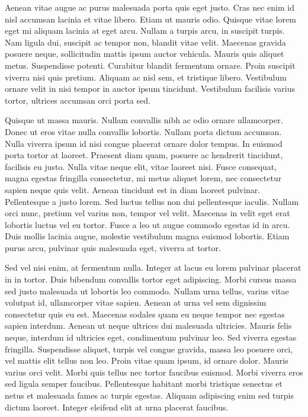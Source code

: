 Aenean vitae augue ac purus malesuada porta quis eget justo.
Cras nec enim id nisl accumsan lacinia et vitae libero.
Etiam ut mauris odio.
Quisque vitae lorem eget mi aliquam lacinia at eget arcu.
Nullam a turpis arcu, in suscipit turpis.
Nam ligula dui, suscipit ac tempor non, blandit vitae velit.
Maecenas gravida posuere neque, sollicitudin mattis ipsum auctor vehicula.
Mauris quis aliquet metus.
Suspendisse potenti.
Curabitur blandit fermentum ornare.
Proin suscipit viverra nisi quis pretium.
Aliquam ac nisl sem, et tristique libero.
Vestibulum ornare velit in nisi tempor in auctor ipsum tincidunt.
Vestibulum facilisis varius tortor, ultrices accumsan orci porta sed.

Quisque ut massa mauris.
Nullam convallis nibh ac odio ornare ullamcorper.
Donec ut eros vitae nulla convallis lobortis.
Nullam porta dictum accumsan.
Nulla viverra ipsum id nisi congue placerat ornare dolor tempus.
In euismod porta tortor at laoreet.
Praesent diam quam, posuere ac hendrerit tincidunt, facilisis eu justo.
Nulla vitae neque elit, vitae laoreet nisi.
Fusce consequat, magna egestas fringilla consectetur, mi metus aliquet lorem, nec consectetur sapien neque quis velit.
Aenean tincidunt est in diam laoreet pulvinar.
Pellentesque a justo lorem.
Sed luctus tellus non dui pellentesque iaculis.
Nullam orci nunc, pretium vel varius non, tempor vel velit.
Maecenas in velit eget erat lobortis luctus vel eu tortor.
Fusce a leo ut augue commodo egestas id in arcu.
Duis mollis lacinia augue, molestie vestibulum magna euismod lobortis.
Etiam purus arcu, pulvinar quis malesuada eget, viverra at tortor.

Sed vel nisi enim, at fermentum nulla.
Integer at lacus eu lorem pulvinar placerat in in tortor.
Duis bibendum convallis tortor eget adipiscing.
Morbi cursus massa sed justo malesuada ut lobortis leo commodo.
Nullam urna tellus, varius vitae volutpat id, ullamcorper vitae sapien.
Aenean at urna vel sem dignissim consectetur quis eu est.
Maecenas sodales quam eu neque tempor nec egestas sapien interdum.
Aenean ut neque ultrices dui malesuada ultricies.
Mauris felis neque, interdum id ultricies eget, condimentum pulvinar leo.
Sed viverra egestas fringilla.
Suspendisse aliquet, turpis vel congue gravida, massa leo posuere orci, vel mattis elit tellus non leo.
Proin vitae quam ipsum, id ornare dolor.
Mauris varius orci velit.
Morbi quis tellus nec tortor faucibus euismod.
Morbi viverra eros sed ligula semper faucibus.
Pellentesque habitant morbi tristique senectus et netus et malesuada fames ac turpis egestas.
Aliquam adipiscing enim sed turpis dictum laoreet.
Integer eleifend elit at urna placerat faucibus.

